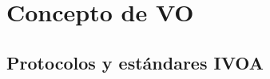 \section{Concepto de VO}

\subsection{Protocolos y estándares IVOA}

\begin{frame}
\frametitle{}
\end{frame}
